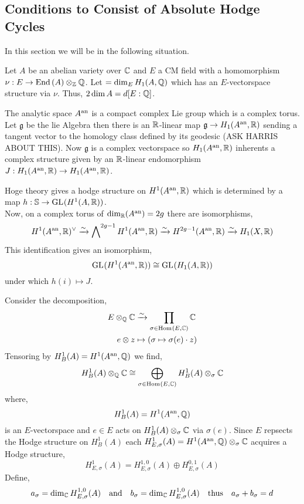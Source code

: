 \documentclass[12pt]{article}
\begin{document}
\subsection{Conditions to Consist of Absolute Hodge Cycles}

\begin{remark}
In this section we will be in the following situation. 
\end{remark}

\begin{definition}
Let $A$ be an abelian variety over $\mathbb{C}$ and $E$ a CM field with a homomorphism $\nu : E \to \mathrm{End} \left( A \right) \otimes_{\mathbb{Z}} \mathbb{Q}$. Let $ = \dim_{E} H_1(A, \mathbb{Q})$ which has an $E$-vectorspace structure via $\nu$. Thus, $2 \dim{A} = d [E : \mathbb{Q}]$. 
\end{definition}

\newcommand{\g}{\mathfrak{g}}

\begin{proposition}
The analytic space $A^{\mathrm{an}}$ is a compact complex Lie group which is a complex torus. Let $\g$ be the lie Algebra then there is an $\mathbb{R}$-linear map $\g \to H_1(A^\an, \R)$ sending a tangent vector to the homology class defined by its geodesic (ASK HARRIS ABOUT THIS). Now $\g$ is a complex vectorspace so $H_1(A^{\mathrm{an}}, \mathbb{R})$ inherents a complex structure given by an $\mathbb{R}$-linear endomorphism $J : H_1(A^{\mathrm{an}}, \mathbb{R}) \to H_1(A^{\mathrm{an}}, \mathbb{R})$.   
\end{proposition}

\begin{proposition}
Hoge theory gives a hodge structure on $H^1(A^{\mathrm{an}}, \mathbb{R})$ which is determined by a map $h : \mathbb{S} \to \mathrm{GL}_{}(H^1(A, \mathbb{R}))$.
\bigskip\\
Now, on a complex torus of $\dim_{\mathbb{R}}(A^{\mathrm{an}}) = 2g$ there are isomorphisms,
\[ H^1(A^{\mathrm{an}}, \mathbb{R})^\vee \xrightarrow{\sim} \bigwedge\nolimits^{2 g-1} H^1(A^{\mathrm{an}}, \mathbb{R}) \xrightarrow{\sim} H^{2g - 1}(A^{\mathrm{an}}, \mathbb{R}) \xrightarrow{\sim} H_1(X, \mathbb{R}) \]
This identification gives an isomorphism,
\[ \mathrm{GL}_{}(H^1(A^{\mathrm{an}}, \mathbb{R})) \cong \mathrm{GL}_{}(H_1(A, \mathbb{R})) \]
under which $h(i) \mapsto J$. 
\end{proposition}

\begin{proposition}
Consider the decomposition,
\begin{align*}
E \otimes_{\mathbb{Q}} \mathbb{C} & \xrightarrow{\sim} \prod_{\sigma \in \mathrm{Hom}_{} \left( E, \mathbb{C} \right)} \mathbb{C}
\\
e \otimes z & \mapsto (\sigma \mapsto \sigma(e) \cdot z)
\end{align*}
Tensoring by $H^1_B(A) = H^1(A^{\mathrm{an}}, \mathbb{Q})$ we find,
\[ H^1_B(A) \otimes_{\mathbb{Q}} \mathbb{C} \cong \bigoplus_{\sigma \in \mathrm{Hom}_{} \left( E, \mathbb{C} \right)} H^1_{B}(A) \otimes_{\sigma} \mathbb{C} \]
where,
\[ H^1_B(A) = H^1(A^{\mathrm{an}}, \mathbb{Q}) \] 
is an $E$-vectorspace and $e \in E$ acts on $H^1_{B}(A) \otimes_\sigma \mathbb{C}$ via $\sigma(e)$. Since $E$ repsects the Hodge structure on $H^1_B(A)$ each $H^1_{E, \sigma}(A) = H^1(A^{\mathrm{an}}, \mathbb{Q}) \otimes_\sigma \mathbb{C}$ acquires a Hodge structure,
\[ H^1_{E, \sigma}(A) = H^{1,0}_{E, \sigma}(A) \oplus H^{0,1}_{E, \sigma}(A) \]
Define,
\[ a_\sigma = \dim_{\mathbb{C}} H^{1,0}_{E, \sigma}(A) \quad \text{and} \quad b_\sigma = \dim_{\mathbb{C}} H^{1,0}_{E, \sigma}(A) \quad \text{thus} \quad a_\sigma + b_\sigma = d \]
\end{proposition}
\end{document}
